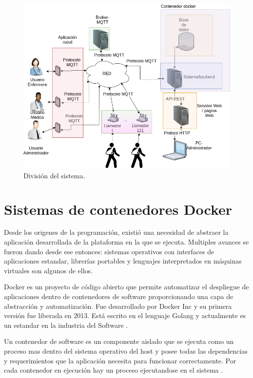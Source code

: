 \begin{figure}[ht]
	\centering
	\includegraphics[scale=.45]{./Figures/DiagramaSistemaOrganizado.png}
	\caption{División del sistema.}
	\label{fig:División del sistema}
\end{figure}



\section{Sistemas de contenedores Docker}
\label{sec:Docker}

Desde los origenes de la programación, existió una necesidad de abstraer la aplicación desarrollada de la plataforma en la que se ejecuta. Multiples avances se fueron dando desde ese entonces: sistemas operativos con interfaces de aplicaciones estandar, librerías portables y lenguajes interpretados en máquinas virtuales son algunos de ellos.

Docker es un proyecto de código abierto que permite automatizar el despliegue de aplicaciones dentro de contenedores de software proporcionando una capa de abstracción y automatización. Fue desarrollado por Docker Inc y su primera versión fue liberada en 2013. Está escrito en el lenguaje Golang y actualmente es un estandar en la industria del Software \citep{WEBSITE:8}.

Un contenedor de software es un componente aislado que se ejecuta como un proceso mas dentro del sistema operativo del host y posee todas las dependencias y requerimientos que la aplicación necesita para funcionar correctamente. Por cada contenedor en ejecución hay un proceso ejecutandose en el sistema \citep{WEBSITE:8}.


